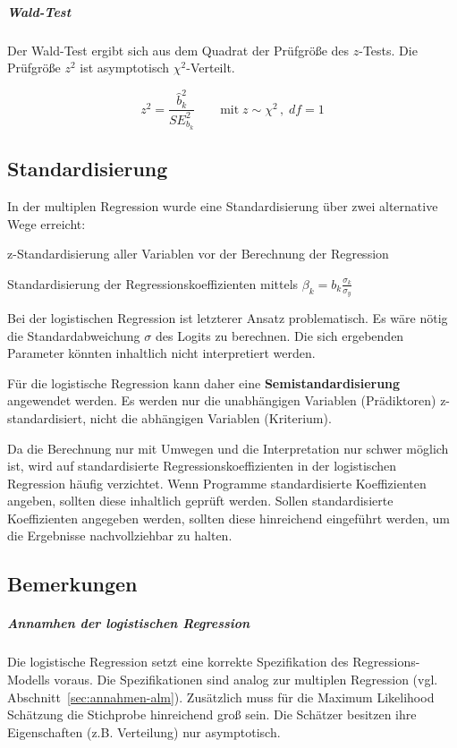 \documentclass{article}
\numberwithin{equation}{section}
\begin{document}
\subparagraph{Wald-Test}

Der Wald-Test ergibt sich aus dem Quadrat der Prüfgröße des $z$-Tests. Die Prüfgröße $z^2$ ist asymptotisch $\chi^2$-Verteilt.

\begin{equation}
z^2 = \frac{\hat b^2_k}{SE^2_{b_k}} \qquad \text{mit} \; z \sim \chi^2\,,\; df=1
\end{equation}

\subsection{Standardisierung}

In der multiplen Regression wurde eine Standardisierung über zwei alternative Wege erreicht:

\begin{compactitem}
\item z-Standardisierung aller Variablen vor der Berechnung der Regression
\item Standardisierung der Regressionskoeffizienten mittels $\beta_k = b_k \frac{\sigma_k}{\sigma_y}$
\end{compactitem}

Bei der logistischen Regression ist letzterer Ansatz problematisch. Es wäre nötig die Standardabweichung $\sigma$ des Logits zu berechnen. Die sich ergebenden Parameter könnten inhaltlich nicht interpretiert werden.

Für die logistische Regression kann daher eine \textbf{Semistandardisierung} angewendet werden. Es werden nur die unabhängigen Variablen (Prädiktoren) z-standardisiert, nicht die abhängigen Variablen (Kriterium).

Da die Berechnung nur mit Umwegen und die Interpretation nur schwer möglich ist, wird auf standardisierte Regressionskoeffizienten in der logistischen Regression häufig verzichtet. Wenn Programme standardisierte Koeffizienten angeben, sollten diese inhaltlich geprüft werden. Sollen standardisierte Koeffizienten angegeben werden, sollten diese hinreichend eingeführt werden, um die Ergebnisse nachvollziehbar zu halten.

\subsection{Bemerkungen}

\subparagraph{Annamhen der logistischen Regression}

Die logistische Regression setzt eine korrekte Spezifikation des Regressions-Modells voraus. Die Spezifikationen sind analog zur multiplen Regression (vgl. Abschnitt~\ref{sec:annahmen-alm}). Zusätzlich muss für die Maximum Likelihood Schätzung die Stichprobe hinreichend groß sein. Die Schätzer besitzen ihre Eigenschaften (z.B. Verteilung) nur asymptotisch.
\end{document}
